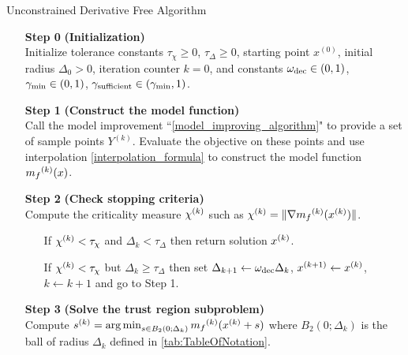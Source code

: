 \begin{algorithm}[H]
    \caption{Unconstrained Derivative Free Algorithm}
    \label{unconstrained_dfo}
    \begin{itemize}
        \item[\textbf{Step 0}] \textbf{(Initialization)} \\
            Initialize tolerance constants $\tau_{\chi} \ge 0$, $\tau_{\Delta} \ge 0$, starting point $x^{(0)}$, initial radius $\Delta_0 > 0$, iteration counter $k=0$, and constants $\omega_{\text{dec}} \in (0, 1)$, $ \gamma_{\text{min}} \in (0, 1)$, $\gamma_{\text{sufficient}} \in (\gamma_{\text{min}}, 1)$.
            
        \item[\textbf{Step 1}] \textbf{(Construct the model function)} \\
            Call the model improvement ``\cref{model_improving_algorithm}" to provide a set of sample points $Y^{(k)}$.
            Evaluate the objective on these points and use interpolation \cref{interpolation_formula} to construct the model function ${{m}_f}^{(k)}(x)$.
        
        \item[\textbf{Step 2}] \textbf{(Check stopping criteria)} \\
            Compute the criticality measure ${\chi^{(k)}}$ such as ${\chi^{(k)}} = \|\nabla{{m}_f}^{(k)}({x^{(k)}})\|$. \begin{itemize}
                \item[] If $ {\chi^{(k)}} < \tau_{\chi} $ and $\Delta_k<\tau_{\Delta}$ then return solution ${x^{(k)}}$.
                \item[] If $ {\chi^{(k)}} < \tau_{\chi} $ but $\Delta_k\ge\tau_{\Delta}$ then  
                set $\Delta_{k+1} \gets \omega_{\text{dec}}\Delta_{k}$, 
                $x^{(k+1)} \gets {x^{(k)}}$,
                $k \gets k+1$ and go to Step 1.
            \end{itemize}
        
        \item[\textbf{Step 3}] \textbf{(Solve the trust region subproblem)} \\
            Compute ${{s}^{(k)}} = \operatorname*{arg\,min}_{s\in B_2(0; \Delta_k)} {{m}_f}^{(k)} ({x^{(k)}} + s)$ where $B_2(0; \Delta_k)$ is the ball of radius $\Delta_k$ defined in \cref{tab:TableOfNotation}.
            

\end{itemize}
\end{algorithm}

